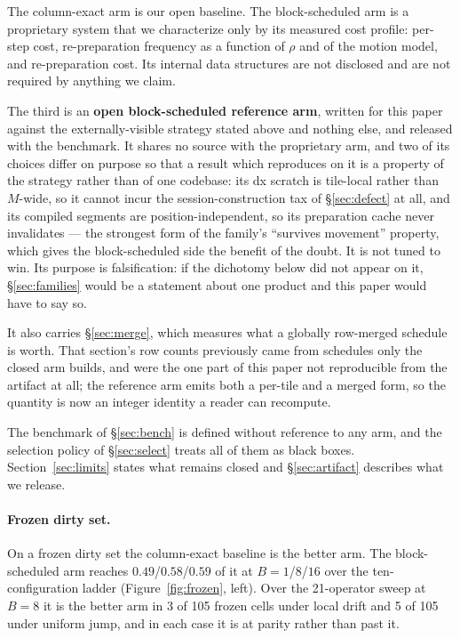 \documentclass{article}
\begin{document}
The column-exact arm is our open baseline. The block-scheduled arm is a
proprietary system that we characterize only by its measured cost profile:
per-step cost, re-preparation frequency as a function of $\rho$ and of the
motion model, and re-preparation cost. Its internal data structures are not
disclosed and are not required by anything we claim.

The third is an \textbf{open block-scheduled reference arm}, written for this
paper against the externally-visible strategy stated above and nothing else, and
released with the benchmark. It shares no source with the proprietary arm, and
two of its choices differ on purpose so that a result which reproduces on it is a
property of the strategy rather than of one codebase: its dx scratch is
tile-local rather than $M$-wide, so it cannot incur the session-construction tax
of \S\ref{sec:defect} at all, and its compiled segments are position-independent,
so its preparation cache never invalidates --- the strongest form of the family's
``survives movement'' property, which gives the block-scheduled side the benefit of
the doubt. It is not tuned to win. Its purpose is falsification: if the
dichotomy below did not appear on it, \S\ref{sec:families} would be a statement
about one product and this paper would have to say so.

It also carries \S\ref{sec:merge}, which measures what a globally row-merged
schedule is worth. That section's row counts previously came from schedules only
the closed arm builds, and were the one part of this paper not reproducible from
the artifact at all; the reference arm emits both a per-tile and a merged form,
so the quantity is now an integer identity a reader can recompute.

The benchmark of \S\ref{sec:bench} is defined without reference to any arm, and
the selection policy of \S\ref{sec:select} treats all of them as black boxes.
Section~\ref{sec:limits} states what remains closed and
\S\ref{sec:artifact} describes what we release.

\paragraph{Frozen dirty set.}
On a frozen dirty set the column-exact baseline is the better arm. The
block-scheduled arm reaches $0.49$/$0.58$/$0.59$ of it at $B{=}1$/$8$/$16$ over
the ten-configuration ladder (Figure~\ref{fig:frozen}, left). Over the
21-operator sweep at $B{=}8$ it is the better arm in 3 of 105 frozen cells under
local drift and 5 of 105 under uniform jump, and in each case it is at parity
rather than past it.
\end{document}
